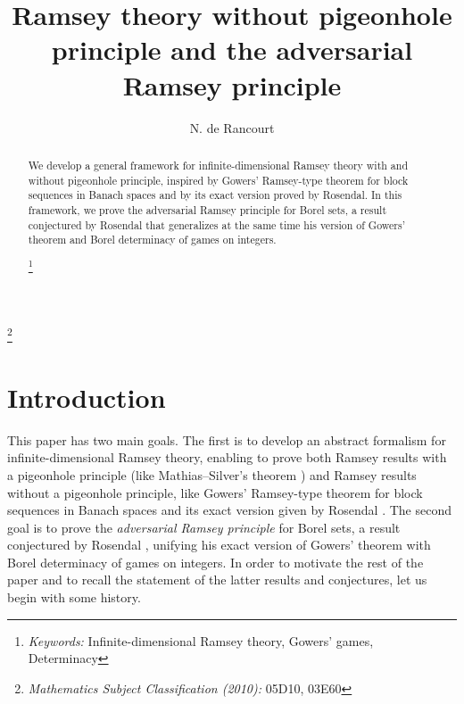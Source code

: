 \documentclass[a4paper,11pt]{article}
\def\subjclass#1{{\renewcommand{\thefootnote}{}%
\footnote{\emph{Mathematics Subject Classification (2010):} #1}}}
\def\keywords#1{{\renewcommand{\thefootnote}{}%
\footnote{\emph{Keywords:} #1}}}
\theoremstyle{definition}
\numberwithin{equation}{section}
\begin{document}





\title{Ramsey theory without pigeonhole principle and the adversarial Ramsey principle}

\author{N. de Rancourt}

\date{}

\maketitle



\subjclass{05D10, 03E60}


\begin{abstract}
We develop a general framework for infinite-dimensional Ramsey theory with and without pigeonhole principle, inspired by Gowers' Ramsey-type theorem for block sequences in Banach spaces and by its exact version proved by Rosendal. In this framework, we prove the adversarial Ramsey principle for Borel sets, a result conjectured by Rosendal that generalizes at the same time his version of Gowers' theorem and Borel determinacy of games on integers.

\keywords{Infinite-dimensional Ramsey theory, Gowers' games, Determinacy}
\end{abstract}

\section{Introduction}\label{par1}

This paper has two main goals. The first is to develop an abstract formalism for infinite-dimensional Ramsey theory, enabling to prove both Ramsey results with a pigeonhole principle (like Mathias--Silver's theorem \cite{mathias, silver}) and Ramsey results without a pigeonhole principle, like Gowers' Ramsey-type theorem for block sequences in Banach spaces \cite{GowersRamsey} and its exact version given by Rosendal \cite{RosendalGowers}. The second goal is to prove the \emph{adversarial Ramsey principle} for Borel sets, a result conjectured by Rosendal \cite{Rosendaladverse}, unifying his exact version of Gowers' theorem with Borel determinacy of games on integers. In order to motivate the rest of the paper and to recall the statement of the latter results and conjectures, let us begin with some history.
\end{document}

